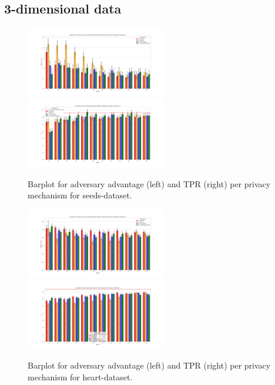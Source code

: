 \subsection{3-dimensional data}
\begin{figure}[H]
    \centering
    \begin{minipage}[c]{1.1\textwidth}
        \includegraphics[width=0.55\textwidth]{Results/RQ2/seeds-dataset/shokri_mi_adv_seeds-dataset_comparison.png}
        \includegraphics[width=0.55\textwidth]{Results/RQ2/seeds-dataset/tpr_seeds-dataset_comparison.png}
        \caption{Barplot for adversary advantage (left) and TPR (right) per privacy mechanism for seeds-dataset.}
        \label{fig:privacy_seeds-dataset_comparison_3d_aa_plot}
    \end{minipage}
    \begin{minipage}[c]{1.1\textwidth}
        \includegraphics[width=0.55\textwidth]{Results/RQ2/heart-dataset/shokri_mi_adv_heart-dataset_comparison.png}
        \includegraphics[width=0.55\textwidth]{Results/RQ2/heart-dataset/tpr_heart-dataset_comparison.png}
        \caption{Barplot for adversary advantage (left) and TPR (right) per privacy mechanism for heart-dataset.}
        \label{fig:privacy_heart-dataset_comparison_3d_aa_plot}
    \end{minipage}
\end{figure}
